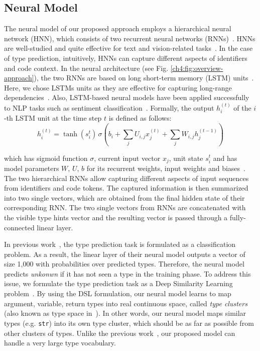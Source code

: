 \subsection{Neural Model}
The neural model of our proposed approach employs a hierarchical neural network (HNN), which consists of two recurrent neural networks (RNNs)~\cite{williams1989learning}. HNNs are well-studied and quite effective for text and vision-related tasks~\cite{liu2020hienn, zheng2019hierarchical, du2015hierarchical}. In the case of type prediction, intuitively, HNNs can capture different aspects of identifiers and code context. In the neural architecture (see Fig. \ref{ch4:fig:overview-approach}), the two RNNs are based on long short-term memory (LSTM) units~\cite{hochreiter1997long}. Here, we chose LSTMs units as they are effective for capturing long-range dependencies~\cite{goodfellow2016deep}. Also, LSTM-based neural models have been applied successfully to NLP tasks such as sentiment classification~\cite{rao2018lstm}. Formally, the output $h_{i}^{(t)}$ of the $i$-th LSTM unit at the time step $t$ is defined as follows:
\begin{equation}
h_{i}^{(t)} = \tanh(s_{i}^{t}) \, \sigma\left( b_{i} +  \sum\limits_{j}{U_{i,j}x_{j}^{(t)} + \sum\limits_{j}{W_{i,j}h_{j}^{(t-1)}}} \right)
\end{equation}

\noindent which has sigmoid function $\sigma$, current input vector $x_{j}$, unit state $s_{i}^{t}$ and has model parameters $W$, $U$, $b$ for its recurrent weights, input weights and biases~\cite{goodfellow2016deep}. The two hierarchical RNNs allow capturing different aspects of input sequences from identifiers and code tokens. The captured information is then summarized into two single vectors, which are obtained from the final hidden state of their corresponding RNN. The two single vectors from RNNs are concatenated with the visible type hints vector and the resulting vector is passed through a fully-connected linear layer.

In previous work~\cite{pradel2019typewriter, malik2019nl2type}, the type prediction task is formulated as a classification problem. As a result, the linear layer of their neural model outputs a vector of size 1,000 with probabilities over predicted types. Therefore, the neural model predicts \textit{unkonwn} if it has not seen a type in the training phase. To address this issue, we formulate the type prediction task as a Deep Similarity Learning problem~\cite{chopra2005learning, liao2017triplet}. By using the DSL formulation, our neural model learns to map argument, variable, return types into real continuous space, called \textit{type clusters} (also known as type space in~\cite{allamanis2020typilus}). In other words, our neural model maps similar types (e.g. \texttt{str}) into its own type cluster, which should be as far as possible from other clusters of types. Unlike the previous work~\cite{pradel2019typewriter, malik2019nl2type}, our proposed model can handle a very large type vocabulary.

